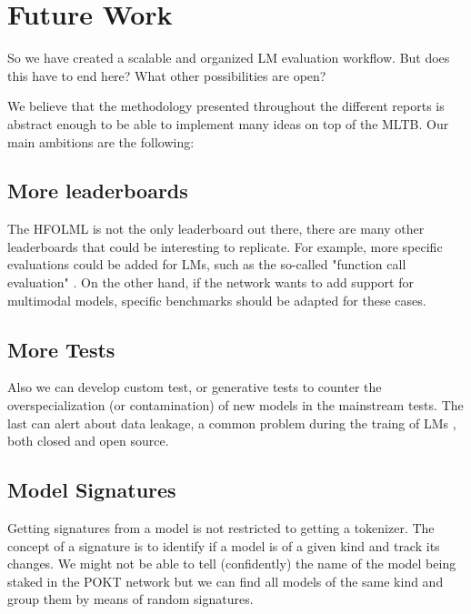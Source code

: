 \section{Future Work}\label{sec:z}

So we have created a scalable and organized \gls{LM} evaluation workflow. 
But does this have to end here? What other possibilities are open?

We believe that the methodology presented throughout the different reports is abstract enough to be able to implement many ideas on top of the \gls{MLTB}. Our main ambitions are the following:

\subsection*{More leaderboards}

The \gls{HFOLML} is not the only leaderboard out there, there are many other leaderboards that could be interesting to replicate. 
For example, more specific evaluations could be added for \glspl{LM}, such as the so-called "function call evaluation" \cite{patil_gorilla_2023}. 
On the other hand, if the network wants to add support for multimodal models, specific benchmarks \cite{yue_mmmu_2024} should be adapted for these cases. 

\subsection*{More Tests}


Also we can develop custom test, or generative tests to counter the overspecialization (or contamination) of new models in the mainstream tests. 
The last can alert about data leakage, a common problem during the traing of \glspl{LM} \cite{zhang_careful_2024, golchin_data_2024, xu_benchmarking_2024, balloccu_leak_2024}, both closed and open source. 

\subsection*{Model Signatures}

Getting signatures from a model is not restricted to getting a tokenizer. 
The concept of a signature is to identify if a model is of a given kind and track its changes. 
We might not be able to tell (confidently) the name of the model being staked in the POKT network but we can find all models of the same kind and group them by means of random signatures.


